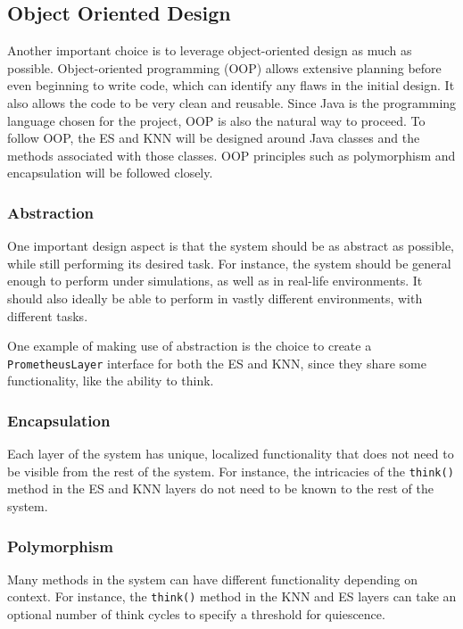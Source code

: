 \documentclass[titlepage,11pt]{article}
\newcommand{\code}[1]{\texttt{#1}}
\begin{document}
\subsection{Object Oriented Design}

Another important choice is to leverage object-oriented design as much as possible. Object-oriented programming (OOP) allows extensive planning before even beginning to write code, which can identify any flaws in the initial design. It also allows the code to be very clean and reusable. Since Java is the programming language chosen for the project, OOP is also the natural way to proceed. To follow OOP, the ES and KNN will be designed around Java classes and the methods associated with those classes. OOP principles such as polymorphism and encapsulation will be followed closely.

\subsubsection{Abstraction}

One important design aspect is that the system should be as abstract as possible, while still performing its desired task. For instance, the system should be general enough to perform under simulations, as well as in real-life environments. It should also ideally be able to perform in vastly different environments, with different tasks.

One example of making use of abstraction is the choice to create a \code{PrometheusLayer} interface for both the ES and KNN, since they share some functionality, like the ability to think.

\subsubsection{Encapsulation}

Each layer of the system has unique, localized functionality that does not need to be visible from the rest of the system. For instance, the intricacies of the \code{think()} method in the ES and KNN layers do not need to be known to the rest of the system.

\subsubsection{Polymorphism}

Many methods in the system can have different functionality depending on context. For instance, the \code{think()} method in the KNN and ES layers can take an optional number of think cycles to specify a threshold for quiescence.
\end{document}
